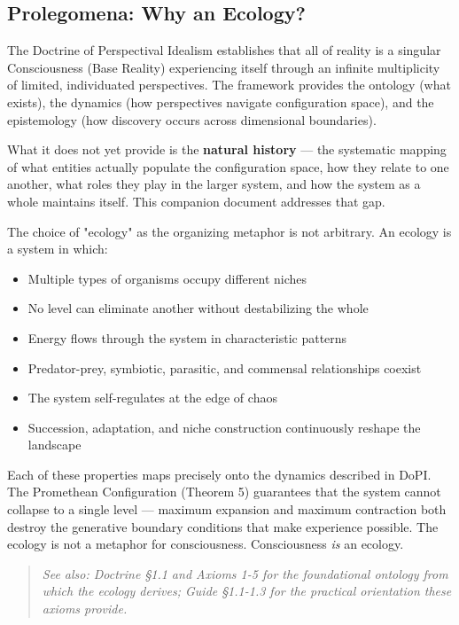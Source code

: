 \subsection*{Prolegomena: Why an Ecology?}


The Doctrine of Perspectival Idealism establishes that all of reality is a singular Consciousness (Base Reality) experiencing itself through an infinite multiplicity of limited, individuated perspectives. The framework provides the ontology (what exists), the dynamics (how perspectives navigate configuration space), and the epistemology (how discovery occurs across dimensional boundaries).


What it does not yet provide is the \textbf{natural history} — the systematic mapping of what entities actually populate the configuration space, how they relate to one another, what roles they play in the larger system, and how the system as a whole maintains itself. This companion document addresses that gap.


The choice of "ecology" as the organizing metaphor is not arbitrary. An ecology is a system in which:


\begin{itemize}[nosep,leftmargin=*]
  \item Multiple types of organisms occupy different niches
  \item No level can eliminate another without destabilizing the whole
  \item Energy flows through the system in characteristic patterns
  \item Predator-prey, symbiotic, parasitic, and commensal relationships coexist
  \item The system self-regulates at the edge of chaos
  \item Succession, adaptation, and niche construction continuously reshape the landscape
\end{itemize}


Each of these properties maps precisely onto the dynamics described in DoPI. The Promethean Configuration (Theorem 5) guarantees that the system cannot collapse to a single level — maximum expansion and maximum contraction both destroy the generative boundary conditions that make experience possible. The ecology is not a metaphor for consciousness. Consciousness \textit{is} an ecology.


\begin{quote}
\itshape
\textit{See also: Doctrine §1.1 and Axioms 1-5 for the foundational ontology from which the ecology derives; Guide §1.1-1.3 for the practical orientation these axioms provide.}
\end{quote}


